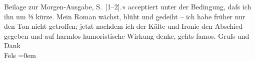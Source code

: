 \begin{ledgroupsized}[t]{13cm}
{{{                     Beilage zur Morgen-Ausgabe, S. [1–2].}}}\label{K_L00407-55h}« acceptiert unter der Bedingung, daſs ich ihn um ⅓ kürze. Mein Roman wächst,
               blüht und gedeiht – ich habe früher nur den Ton nicht getroffen; jetzt nachdem ich
               der Kälte und Ironie den Abschied gegeben und \introOben{}auf\introOben{} harmlos
               humoristische Wirkung denke, gehts famos.\pend
           \pstart
           Gruſs und Dank{\\[\baselineskip]}\spacefill\mbox{Fels}\pend
           \leftskip=0em{}
         
         \endnumbering{}\end{ledgroupsized}  \newcommand{\dateiname}{L00407}\newcommand{\titel}{Friedrich M. Fels an Arthur Schnitzler, [26. 11. 1894]}\newcommand{\editorInnen}{Martin Anton Müller und Gerd-Hermann Susen}
      